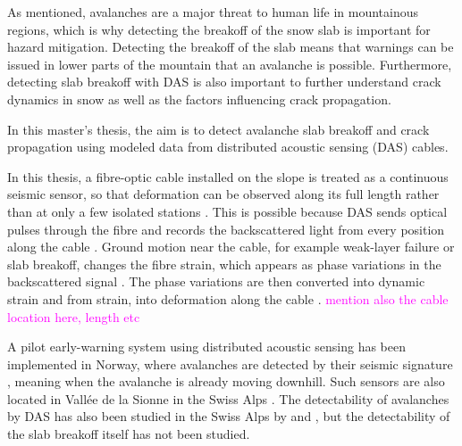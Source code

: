 \documentclass[10pt]{article}
\begin{document}

As mentioned, avalanches are a major threat to human life in mountainous regions, which is why detecting the breakoff of the snow slab is important for hazard mitigation. Detecting the breakoff of the slab means that warnings can be issued in lower parts of the mountain that an avalanche is possible. Furthermore, detecting slab breakoff with DAS is also important to further understand crack dynamics in snow as well as the factors influencing crack propagation. \par

  
  In this master's thesis, the aim is to detect avalanche slab breakoff and crack propagation using modeled data from distributed acoustic sensing (DAS) cables. \par

  In this thesis, a fibre-optic cable installed on the slope is treated as a continuous seismic sensor, so that deformation can be observed along its full length rather than at only a few isolated stations \parencite{parkerDistributedAcousticSensing2014}. This is possible because DAS sends optical pulses through the fibre and records the backscattered light from every position along the cable \parencite{shatalinInterferometricOpticalTimedomain1998}. Ground motion near the cable, for example weak-layer failure or slab breakoff, changes the fibre strain, which appears as phase variations in the backscattered signal \parencite{hartogIntroductionDistributedOptical2017}. The phase variations are then converted into dynamic strain and from strain, into deformation along the cable \parencite{trabattoniStrainDisplacementUsing2023}. \textcolor{magenta}{mention also the cable location here, length etc} \par 

  
  A pilot early-warning system using distributed acoustic sensing has been implemented in Norway, where avalanches are detected by their seismic signature \parencite{turquetAutomatedSnowAvalanche2024}, meaning when the avalanche is already moving downhill. Such sensors are also located in Vallée de la Sionne in the Swiss Alps \parencite{paitzPhenomenologyAvalancheRecordings2023}. The detectability of avalanches by DAS has also been studied in the Swiss Alps by \cite{paitzPhenomenologyAvalancheRecordings2023} and \cite{edmeFiberopticDetectionSnow2023}, but the detectability of the slab breakoff itself has not been studied. 
\end{document}
